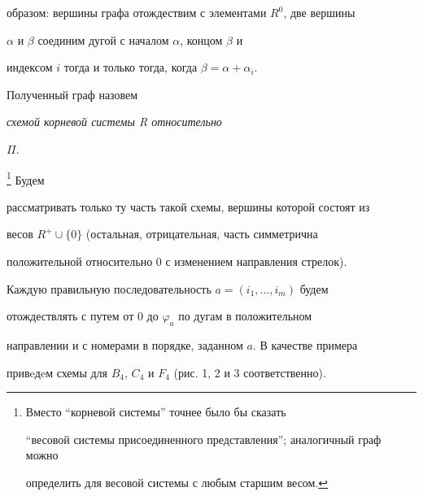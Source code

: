 образом: вершины графа отождествим с элементами $R^0$, две вершины


$\alpha$ и $\beta$ соединим дугой с началом $\alpha$, концом $\beta$ и


индексом $i$ тогда и только тогда, когда $\beta=\alpha+\alpha_i$.


Полученный граф назовем {\it схемой корневой системы R относительно


$\Pi $.}\footnote{Вместо ``корневой системы'' точнее было бы сказать


``весовой системы присоединенного представления''; аналогичный граф можно


определить для весовой системы с любым старшим весом.} Будем


рассматривать только ту часть такой схемы, вершины которой состоят из


весов $R^+\cup \{0\}$ (остальная, отрицательная, часть симметрична


положительной относительно $0$ с изменением направления стрелок).


Каждую правильную последовательность $a=(i_1,\dotsc,i_m)$ будем


отождествлять с путем от $0$ до $\varphi_a$ по дугам в положительном


направлении и с номерами в порядке, заданном $a$. В качестве примера


привeдeм схемы для $B_4$, $C_4$ и $F_4$ (рис. 1, 2 и 3 соответственно).





